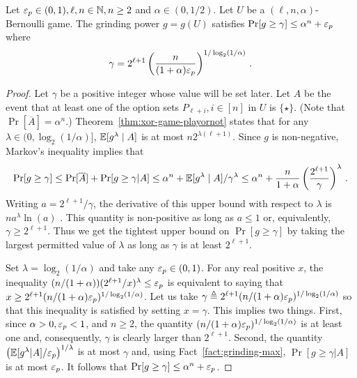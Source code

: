     \begin{lemma}\label{lemma:xor-game-Bernoulli-gamma}
        Let $\mathsf{\varepsilon}_p \in (0,1), \ell, n \in \mathbb{N}, n \geq 2$ and 
        $\alpha \in (0, 1/2)$.
        Let $U$ be a $(\ell, n, \alpha)$-Bernoulli game. 
        The grinding power $g = g(U)$ 
        satisfies $\Pr[g \geq \gamma] \leq \alpha^n + \mathsf{\varepsilon}_p$ where 
        \begin{align}\label{eq:bernoulli-game-gamma}
            \gamma = 2^{\ell + 1} \left(
                \frac{n}{(1+\alpha)\mathsf{\varepsilon}_p}
            \right)^{1/\log_2(1/\alpha)}
            \,.
        \end{align}
    \end{lemma}
    \begin{proof}
        Let $\gamma$ be a positive integer whose value will be set later.
        Let $A$ be the event that 
        at least one of the option sets $P_{\ell + i}, i \in [n]$ in $U$ is $\{\star\}$. 
        (Note that $\Pr[\overline{A}] = \alpha^n$.)
        Theorem~\ref{thm:xor-game-playornot} states that 
        for any $\lambda \in (0, \log_2(1/\alpha)]$, 
        $\operatorname{\mathbb{E}} [g^\lambda \mid A]$ is at most $n 2^{\lambda(\ell + 1)}$. 
        Since $g$ is non-negative, 
        Markov's inequality implies that 
        $$
        \Pr[g \geq \gamma] 
        \leq \Pr[\overline{A}] + \Pr[g \geq \gamma | A]
        \leq \alpha^n  + \operatorname{\mathbb{E}}[g^\lambda \mid A]/\gamma^\lambda
        \leq \alpha^n  + \frac{n}{1+\alpha} 
            \left(\frac{2^{\ell + 1}}{\gamma}\right)^\lambda
        \,.$$ 
        Writing $a = 2^{\ell + 1}/\gamma$, 
        the derivative of this upper bound with respect to $\lambda$ is 
        $n a^\lambda \ln(a)$ . 
        This quantity is non-positive as long as $a \leq 1$ or, equivalently, 
        $\gamma \geq 2^{\ell + 1}$. 
        Thus we get the tightest upper bound on $\Pr[g \geq \gamma]$ 
        by taking the largest permitted value of $\lambda$ 
        as long as $\gamma$ is at least $2^{\ell + 1}$. 
        
        Set $\lambda = \log_2(1/\alpha)$ and take any $\mathsf{\varepsilon}_p \in (0,1)$. 
        For any real positive $x$, 
        the inequality $(n/(1+\alpha)) (2^{\ell + 1}/x)^\lambda \leq \mathsf{\varepsilon}_p$ 
        is equivalent to saying that 
        $x \geq 2^{\ell + 1} (n/(1+\alpha)\mathsf{\varepsilon}_p)^{1/\log_2(1/\alpha)}$. 
        Let us take 
        $\gamma \triangleq 2^{\ell + 1} (n/(1+\alpha)\mathsf{\varepsilon}_p)^{1/\log_2(1/\alpha)}$ 
        so that this inequality is satisfied by setting $x = \gamma$. 
        This implies two things. 
        First, 
        since $\alpha > 0, \mathsf{\varepsilon}_p < 1$, and $n \geq 2$, 
        the quantity  $(n/(1+\alpha)\mathsf{\varepsilon}_p)^{1/\log_2(1/\alpha)}$ is at least one and, consequently, 
        $\gamma$ is clearly larger than $2^{\ell + 1}$. 
        Second, 
        the quantity 
        $\left( \operatorname{\mathbb{E}}[g^\lambda | A]/\mathsf{\varepsilon}_p \right)^{1/\lambda}$ is at most $\gamma$ 
        and, using Fact~\ref{fact:grinding-max}, 
        $\Pr[g \geq \gamma | A]$ is at most $\mathsf{\varepsilon}_p$. 
        It follows that $\Pr[g \geq \gamma] \leq \alpha^n + \mathsf{\varepsilon}_p$.
    \end{proof}


